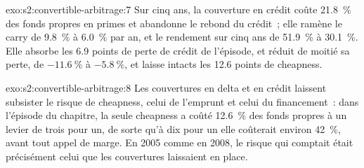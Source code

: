 \begin{solution}{exo:s2:convertible-arbitrage:7}
Sur cinq ans, la couverture en crédit coûte 21.8~\% des fonds propres en primes et abandonne le rebond du crédit~; elle ramène le carry de 9.8~\% à 6.0~\% par an, et le rendement sur cinq ans de 51.9~\% à 30.1~\%.
Elle absorbe les 6.9 points de perte de crédit de l'épisode, et réduit de moitié sa perte, de $-11.6~\%$ à
$-5.8~\%$, et laisse intacts les 12.6 points de cheapness.
\end{solution}

\begin{solution}{exo:s2:convertible-arbitrage:8}
Les couvertures en delta et en crédit laissent subsister le risque de cheapness, celui de l'emprunt et celui du financement~: dans l'épisode du chapitre, la seule cheapness a coûté 12.6~\% des fonds propres à un levier de trois pour un,
de sorte qu'à dix pour un elle coûterait environ 42~\%, avant tout appel de marge. En 2005 comme en 2008, le risque qui comptait était précisément celui que les couvertures laissaient en place.
\end{solution}

